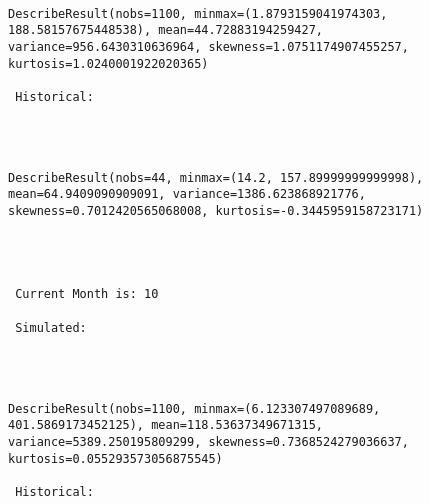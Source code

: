 \documentclass[11pt]{article}
\begin{document}
    \begin{center}
    \end{center}
    { \hspace*{\fill} \\}
    
    \begin{Verbatim}[commandchars=\\\{\}]
DescribeResult(nobs=1100, minmax=(1.8793159041974303, 188.58157675448538), mean=44.72883194259427, variance=956.6430310636964, skewness=1.0751174907455257, kurtosis=1.0240001922020365)

 Historical: 
 

    \end{Verbatim}

    \begin{center}
    \end{center}
    { \hspace*{\fill} \\}
    
    \begin{Verbatim}[commandchars=\\\{\}]
DescribeResult(nobs=44, minmax=(14.2, 157.89999999999998), mean=64.9409090909091, variance=1386.623868921776, skewness=0.7012420565068008, kurtosis=-0.3445959158723171) 



 
 Current Month is: 10

 Simulated: 
 

    \end{Verbatim}

    \begin{center}
    \end{center}
    { \hspace*{\fill} \\}
    
    \begin{Verbatim}[commandchars=\\\{\}]
DescribeResult(nobs=1100, minmax=(6.123307497089689, 401.5869173452125), mean=118.53637349671315, variance=5389.250195809299, skewness=0.7368524279036637, kurtosis=0.055293573056875545)

 Historical: 
 

    \end{Verbatim}
\end{document}
